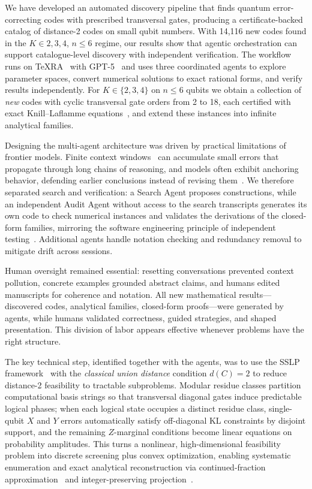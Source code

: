 \documentclass[pdflatex,sn-nature]{sn-jnl}%
\theoremstyle{thmstyleone}%
\theoremstyle{thmstyletwo}%
\theoremstyle{thmstylethree}%
\begin{document}
We have developed an automated discovery pipeline that finds quantum error-correcting codes with prescribed transversal gates, producing a certificate-backed catalog of distance-2 codes on small qubit numbers. With 14,116 new codes found in the $K\in{2,3,4}$, $n\le 6$ regime, our results show that agentic orchestration can support catalogue-level discovery with independent verification. The workflow runs on TeXRA~\cite{Texra2025TeXRA} with GPT-5~\cite{Openai2025GPT} and uses three coordinated agents to explore parameter spaces, convert numerical solutions to exact rational forms, and verify results independently. For $K \in \{2,3,4\}$ on $n \le 6$ qubits we obtain a collection of \emph{new} codes with cyclic transversal gate orders from 2 to 18, each certified with exact Knill--Laflamme equations~\cite{Knill1997Theory}, and extend these instances into infinite analytical families.

Designing the multi-agent architecture was driven by practical limitations of frontier models. Finite context windows~\cite{Openai2025GPT,Anthropic2024Model} can accumulate small errors that propagate through long chains of reasoning, and models often exhibit anchoring behavior, defending earlier conclusions instead of revising them~\cite{Lightman2023Lets}. We therefore separated search and verification: a Search Agent proposes constructions, while an independent Audit Agent without access to the search transcripts generates its own code to check numerical instances and validates the derivations of the closed-form families, mirroring the software engineering principle of independent testing~\cite{Jimenez2024SWEbench}. Additional agents handle notation checking and redundancy removal to mitigate drift across sessions.

Human oversight remained essential: resetting conversations prevented context pollution, concrete examples grounded abstract claims, and humans edited manuscripts for coherence and notation. All new mathematical results---discovered codes, analytical families, closed-form proofs---were generated by agents, while humans validated correctness, guided strategies, and shaped presentation. This division of labor appears effective whenever problems have the right structure.

The key technical step, identified together with the agents, was to use the SSLP framework~\cite{Zhang2025Transversal} with the \emph{classical union distance} condition $d(C)=2$ to reduce distance-2 feasibility to tractable subproblems. Modular residue classes partition computational basis strings so that transversal diagonal gates induce predictable logical phases; when each logical state occupies a distinct residue class, single-qubit $X$ and $Y$ errors automatically satisfy off-diagonal KL constraints by disjoint support, and the remaining $Z$-marginal conditions become linear equations on probability amplitudes. This turns a nonlinear, high-dimensional feasibility problem into discrete screening plus convex optimization, enabling systematic enumeration and exact analytical reconstruction via continued-fraction approximation~\cite{Ferguson1999Analysis,Lenstra1982Factoring} and integer-preserving projection~\cite{Schrijver1986Theory}.
\end{document}
